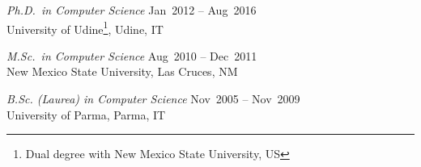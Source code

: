 


\beginTitleList
	\item 
	{\em Ph.D.~in Computer Science} \hfill Jan~2012 -- Aug~2016 \\
	\hspace*{8pt} University of Udine\footnote{Dual degree with New Mexico State University, US}, Udine, IT\\


	\item 
	{\em M.Sc.~in Computer Science} \hfill Aug~2010 -- Dec~2011\\
	\hspace*{8pt} New Mexico State University, Las Cruces, NM 

	
	\item 
	{\em B.Sc. (Laurea) in Computer Science} \hfill Nov~2005 -- Nov~2009\\
	\hspace*{8pt} {University of Parma}, Parma, IT
\endTitleList